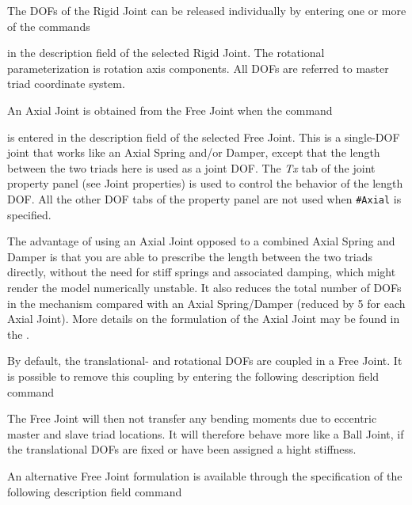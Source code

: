 \clearpage



The DOFs of the Rigid Joint can be released individually by entering one
or more of the commands


\noindent
in the description field of the selected Rigid Joint. The rotational
parameterization is rotation axis components. All DOFs are referred to
master triad coordinate system.



An Axial Joint is obtained from the Free Joint when the command


\noindent
is entered in the description field of the selected Free Joint.
This is a single-DOF joint that works like an Axial Spring and/or Damper,
except that the length between the two triads here is used as a joint DOF.
The {\sl Tx} tab of the joint property panel (see 
{Joint properties}) is used to control the behavior of the length DOF.
All the other DOF tabs of the property panel are not used when {\tt\#Axial}
is specified.

The advantage of using an Axial Joint opposed to a combined Axial Spring
and Damper is that you are able to prescribe the length between the two
triads directly, without the need for stiff springs and associated
damping, which might render the model numerically unstable. It also
reduces the total number of DOFs in the mechanism compared with an Axial
Spring/Damper (reduced by 5 for each Axial Joint). More details on the
formulation of the Axial Joint may be found in the
.



By default, the translational- and rotational DOFs are coupled in a Free Joint.
It is possible to remove this coupling by entering the following description
field command


\noindent
The Free Joint will then not transfer any bending moments due to eccentric
master and slave triad locations.
It will therefore behave more like a Ball Joint, if the translational DOFs
are fixed or have been assigned a hight stiffness.

An alternative Free Joint formulation is available through the
specification of the following description field command

